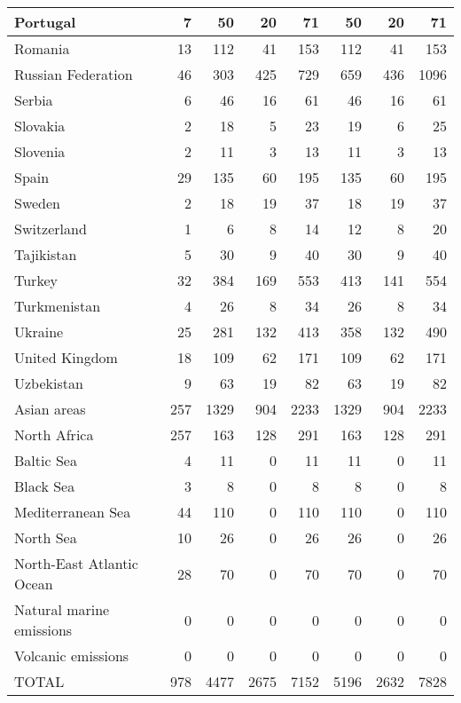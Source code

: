 \begin{table}
\begin{center}
\begin{tabular}{|l|r|r|r|r||r|r|r|}
                      Portugal&     7&    50&    20&    71&    50&    20&    71 \\\hline
                       Romania&    13&   112&    41&   153&   112&    41&   153 \\\hline
            Russian Federation&    46&   303&   425&   729&   659&   436&  1096 \\\hline
                        Serbia&     6&    46&    16&    61&    46&    16&    61 \\\hline
                      Slovakia&     2&    18&     5&    23&    19&     6&    25 \\\hline
                      Slovenia&     2&    11&     3&    13&    11&     3&    13 \\\hline
                         Spain&    29&   135&    60&   195&   135&    60&   195 \\\hline
                        Sweden&     2&    18&    19&    37&    18&    19&    37 \\\hline
                   Switzerland&     1&     6&     8&    14&    12&     8&    20 \\\hline
                    Tajikistan&     5&    30&     9&    40&    30&     9&    40 \\\hline
                        Turkey&    32&   384&   169&   553&   413&   141&   554 \\\hline
                  Turkmenistan&     4&    26&     8&    34&    26&     8&    34 \\\hline
                       Ukraine&    25&   281&   132&   413&   358&   132&   490 \\\hline
                United Kingdom&    18&   109&    62&   171&   109&    62&   171 \\\hline
                    Uzbekistan&     9&    63&    19&    82&    63&    19&    82 \\\hline
                   Asian areas&   257&  1329&   904&  2233&  1329&   904&  2233 \\\hline
                  North Africa&   257&   163&   128&   291&   163&   128&   291 \\\hline
                    Baltic Sea&     4&    11&     0&    11&    11&     0&    11 \\\hline
                     Black Sea&     3&     8&     0&     8&     8&     0&     8 \\\hline
             Mediterranean Sea&    44&   110&     0&   110&   110&     0&   110 \\\hline
                     North Sea&    10&    26&     0&    26&    26&     0&    26 \\\hline
     North-East Atlantic Ocean&    28&    70&     0&    70&    70&     0&    70 \\\hline
      Natural marine emissions&     0&     0&     0&     0&     0&     0&     0 \\\hline
            Volcanic emissions&     0&     0&     0&     0&     0&     0&     0 \\\hline\hline
                         TOTAL&   978&  4477&  2675&  7152&  5196&  2632&  7828 \\\hline 



\end{tabular}
\end{center}
\end{table}
